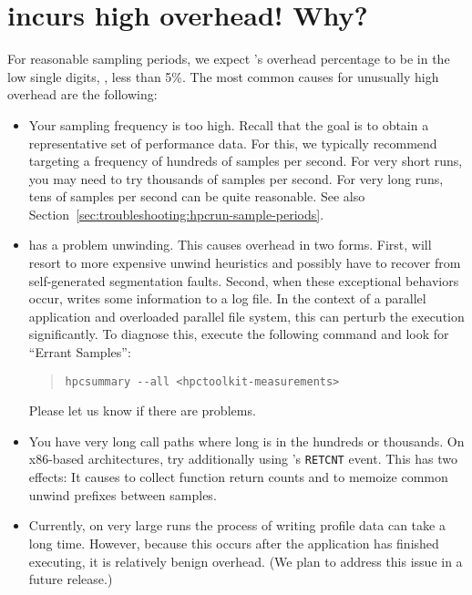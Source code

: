 \documentclass[11pt,letterpaper]{report}
\begin{document}
\section{\hpcrun{} incurs high overhead! Why?}

For reasonable sampling periods, we expect \hpcrun{}'s overhead percentage to be in the low single digits, \eg{}, less than 5\%.
The most common causes for unusually high overhead are the following:
\begin{itemize}

\item Your sampling frequency is too high.
  Recall that the goal is to obtain a representative set of performance data.
  For this, we typically recommend targeting a frequency of hundreds of samples per second.
  For very short runs, you may need to try thousands of samples per second.
  For very long runs, tens of samples per second can be quite reasonable.
  See also Section~\ref{sec:troubleshooting:hpcrun-sample-periods}.

\item \hpcrun{} has a problem unwinding.
  This causes overhead in two forms.
  First, \hpcrun{} will resort to more expensive unwind heuristics and possibly have to recover from self-generated segmentation faults.
  Second, when these exceptional behaviors occur, \hpcrun{} writes some information to a log file.
  In the context of a parallel application and overloaded parallel file system, this can perturb the execution significantly.
  To diagnose this, execute the following command and look for ``Errant Samples'':
  \begin{quote}
  \verb|hpcsummary --all <hpctoolkit-measurements>|
  \end{quote}
  Please let us know if there are problems.

\item You have very long call paths where long is in the hundreds or thousands.
  On x86-based architectures, try additionally using \hpcrun{}'s \texttt{RETCNT} event.
  This has two effects: It causes \hpcrun{} to collect function return counts and to memoize common unwind prefixes between samples.

\item Currently, on very large runs the process of writing profile data can take a long time.
  However, because this occurs after the application has finished executing, it is relatively benign overhead.
  (We plan to address this issue in a future release.)

\end{itemize}
\end{document}
